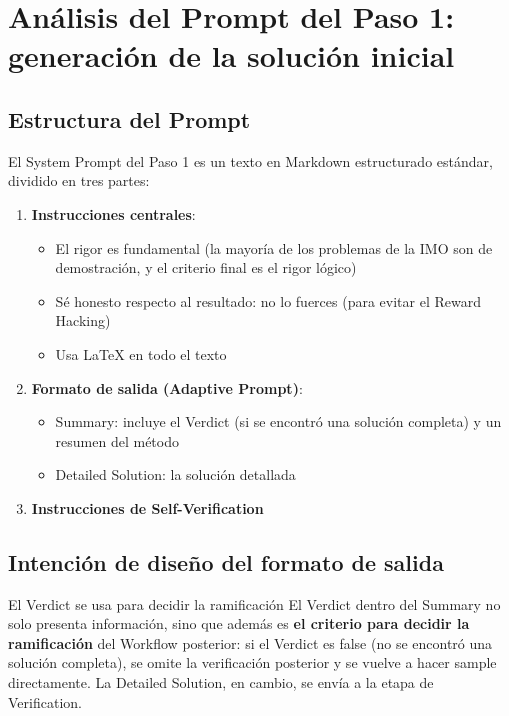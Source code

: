 \section{Análisis del Prompt del Paso 1: generación de la solución inicial}

\subsection{Estructura del Prompt}

El System Prompt del Paso 1 es un texto en Markdown estructurado estándar, dividido en tres partes:

\begin{enumerate}
    \item \textbf{Instrucciones centrales}:
    \begin{itemize}
        \item El rigor es fundamental (la mayoría de los problemas de la IMO son de demostración, y el criterio final es el rigor lógico)
        \item Sé honesto respecto al resultado: no lo fuerces (para evitar el Reward Hacking)
        \item Usa LaTeX en todo el texto
    \end{itemize}
    \item \textbf{Formato de salida (Adaptive Prompt)}:
    \begin{itemize}
        \item Summary: incluye el Verdict (si se encontró una solución completa) y un resumen del método
        \item Detailed Solution: la solución detallada
    \end{itemize}
    \item \textbf{Instrucciones de Self-Verification}
\end{enumerate}

\subsection{Intención de diseño del formato de salida}

\begin{importantbox}{El Verdict se usa para decidir la ramificación}
El Verdict dentro del Summary no solo presenta información, sino que además es \textbf{el criterio para decidir la ramificación} del Workflow posterior: si el Verdict es false (no se encontró una solución completa), se omite la verificación posterior y se vuelve a hacer sample directamente. La Detailed Solution, en cambio, se envía a la etapa de Verification.
\end{importantbox}

